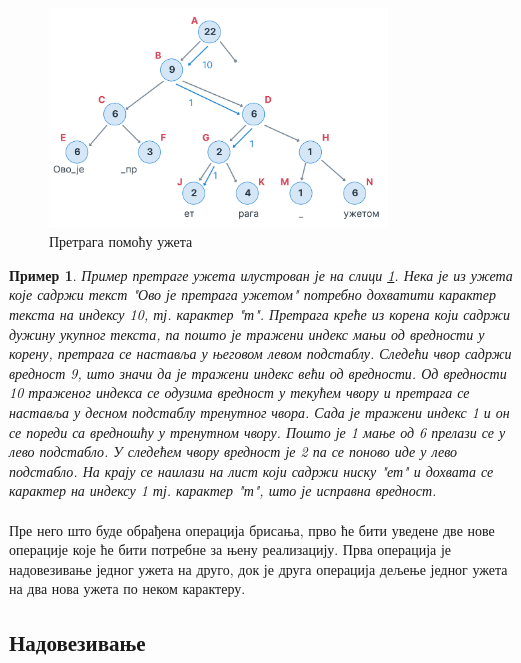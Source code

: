 \documentclass[12pt,oneside]{memoir}
\newtheorem{exmp}{Пример}
\begin{document}
\begin{figure}
  \centering
  \includegraphics[width=0.8\textwidth]{images/rope_search_1.png}
  \caption{Претрага помоћу ужета}
  \label{fig:rope_search}
\end{figure}

\begin{exmp}
Пример претраге ужета илустрован је на слици \ref{fig:rope_search}.
Нека је из ужета које садржи текст \textit{"Ово је претрага ужетом"} потребно дохватити карактер текста на индексу 10, тј. карактер \textit{"т"}. Претрага креће из корена 
који садржи дужину укупног текста, па пошто је тражени индекс мањи од вредности у корену,
претрага се наставља у његовом левом подстаблу. Следећи чвор садржи вредност 9, што значи да је
тражени индекс већи од вредности. Од вредности 10 траженог индекса се одузима вредност
у текућем чвору и претрага се
наставља у десном подстаблу тренутног чвора. Сада је тражени индекс 1 и он се 
пореди са вредношћу у тренутном чвору. Пошто је 1 мање од 6 прелази се у лево подстабло. 
У следећем чвору вредност је 2 па се поново иде у лево подстабло. На крају се наилази на
лист који садржи ниску \textit{"ет"} и дохвата се карактер на индексу 1 тј. карактер
\textit{"т"}, што је исправна вредност.

\end{exmp}

\paragraph{}
Пре него што буде обрађена операција брисања, прво ће бити уведене две нове операције које ће бити потребне за њену реализацију. Прва операција је надовезивање једног ужета на друго,
док је друга операција дељење једног ужета на два нова ужета по неком карактеру.


\subsection{Надовезивање}
\end{document}
